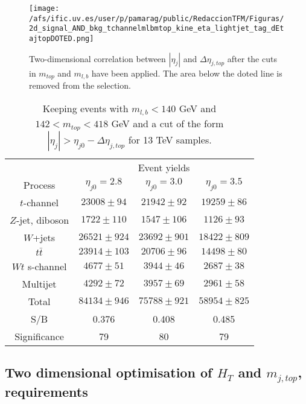 \begin{figure}[h]
\centering
\texttt{[image: /afs/ific.uv.es/user/p/pamarag/public/RedaccionTFM/Figuras/2d\_signal\_AND\_bkg\_tchannelmlbmtop\_kine\_eta\_lightjet\_tag\_dEtajtopDOTED.png]}
\caption{Two-dimensional correlation between $|\eta_j|$ and $\Delta\eta_{j,top}$ after the cuts in $m_{top}$ and $m_{l,b}$ have been applied. The area below the doted line is removed from the selection.}
\label{Fig:Triangular}
\end{figure}

\begin{table} [h]
\begin{center}
\begin{tabular}{|c||c|c|c|} 
 \hline
  & \multicolumn{3}{|c|}{Event yields} \\ \cline{2-4}
 Process & $\eta_{j0}=2.8$ & $\eta_{j0}=3.0$ & $\eta_{j0}=3.5$ \\ \hline
 $t$-channel & $23008 \pm 94 $ & $ 21942\pm 92 $& $ 19259\pm 86 $\\ 
 $Z$-jet, diboson & $ 1722\pm 110 $& $1547 \pm 106 $& $1126 \pm 93 $ \\ 
 $W$+jets & $ 26521\pm 924  $ & $ 23692\pm 901 $& $18422 \pm 809 $\\
 $t\bar{t}$& $ 23914\pm 103  $ & $20706 \pm  96$& $14498 \pm 80 $\\
 $Wt$ s-channel & $4677 \pm 51 $ & $3944 \pm 46 $& $2687 \pm 38 $\\
 Multijet&$4292 \pm 72 $ & $3957 \pm 69$& $2961 \pm 58 $\\
 \hline
 Total & $84134 \pm 946$ & $75788 \pm 921$ & $58954 \pm 825$ \\ \hline \hline
 S/B & 0.376 & 0.408 & 0.485 \\ \hline
 Significance & 79 & 80 & 79 \\ \hline
\end{tabular}
\caption{Keeping events with $m_{l,b} < 140$ GeV and $142 < m_{top} < 418$ GeV and a cut of the form $|\eta_j| > \eta_{j0} - \Delta\eta_{j,top}$ for 13 TeV samples.}
\label{Table:ABCtriang}
\end{center}
\end{table}

\subsection{Two dimensional optimisation of \boldmath$H_{T}$ and \boldmath$m_{j,top}$, requirements}

